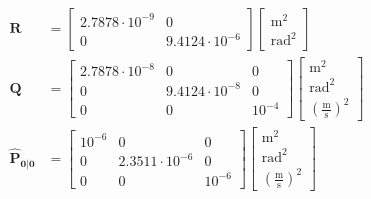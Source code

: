 \documentclass[a4paper,kul]{kulakarticle} %
\begin{document}
\begin{align}
	\mathbf{R} &= \begin{bmatrix} 2.7878\cdot 10^{-9} & 0 \\ 0 & 9.4124\cdot 10^{-6}\end{bmatrix} \begin{bmatrix} \text{m}^2 \\ \text{rad}^2 \end{bmatrix}\\	
	\mathbf{Q} &= \begin{bmatrix} 2.7878\cdot 10^{-8} & 0 & 0\\ 0 & 9.4124\cdot 10^{-8} & 0 \\ 0&0& 10^{-4}\end{bmatrix} \begin{bmatrix} \text{m}^2 \\ \text{rad}^2 \\ \left(\frac{\text{m}}{\text{s}}\right)^2\end{bmatrix} \label{eq:eq28}\\
	\mathbf{\hat{P}_{0|0}} &= \begin{bmatrix} 10^{-6} & 0 & 0\\ 0 & 2.3511\cdot 10^{-6} & 0 \\ 0&0& 10^{-6}\end{bmatrix} \begin{bmatrix} \text{m}^2 \\ \text{rad}^2 \\ \left(\frac{\text{m}}{\text{s}}\right)^2\end{bmatrix}
\end{align}
\end{document}
